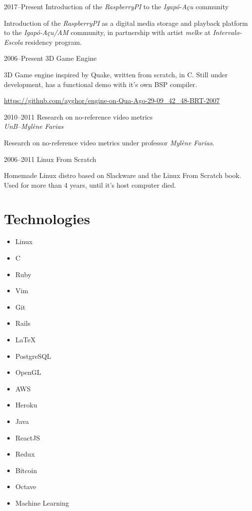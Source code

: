 \documentclass[a4paper,twoside]{simplecv}
\begin{document}
\begin{topic}
%
%
%
\item[2017--Present] Introduction of the \emph{RaspberryPI} to the \emph{Igapó-Açu} community

	Introduction of the \emph{RaspberryPI} as a digital media storage and
	playback platform to the \emph{Igapó-Açu/AM} community, in partnership
	with artist \emph{melke} at \emph{Intervalo-Escola} residency program.

\item[2006--Present] 3D Game Engine

	3D Game engine inspired by Quake, written from scratch, in C. Still
	under development, has a functional demo with it's own BSP compiler.

	{\scriptsize\url{https://github.com/ayghor/engine-on-Qua-Ago-29-09\_42\_48-BRT-2007}}

\item[2010--2011] Research on no-reference video metrics\\
	{\em\small UnB--Mylène Farias}

	Research on no-reference video metrics under professor \emph{Mylène
	Farias}.

\item[2006--2011] Linux From Scratch

	Homemade Linux distro based on Slackware and the Linux From Scratch
	book. Used for more than 4 years, until it's host computer died.

\end{topic}

\section{Technologies}

\begin{multicols}{4}
	\raggedcolumns
	\begin{itemize}
		\item Linux
		\item C
		\item Ruby
		\item Vim
		\item Git
		\item Rails
		\item \LaTeX{}
		\item PostgreSQL
		\item OpenGL
		\item AWS
		\item Heroku
		\item Java
		\item ReactJS
		\item Redux
		\item Bitcoin
		\item Octave
		\item Machine Learning
	\end{itemize}
\end{multicols}
\end{document}
